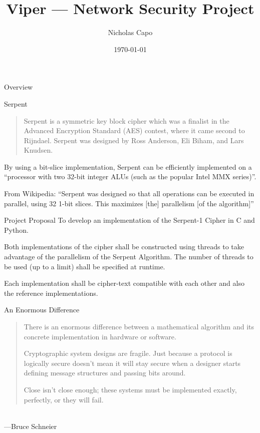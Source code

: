 \documentclass[style=sailor, mode=present]{powerdot}
\title{Viper --- Network Security Project}
\author{Nicholas Capo}
\date{\today}
\begin{document}
\maketitle

\begin{slide}[toc=]{Overview}
\tableofcontents[type=1]
\end{slide}

\begin{slide}{Serpent}
\blockquote{Serpent is a symmetric key block cipher which was a finalist in the Advanced Encryption Standard (AES) contest, where it came second to Rijndael. Serpent was designed by Ross Anderson, Eli Biham, and Lars Knudsen.}\cite{wikipedia}\pause
\medskip

By using a bit-slice implementation, Serpent can be efficiently implemented on a \enquote{processor with two 32-bit integer ALUs (such as the popular Intel MMX series)}.\cite[2]{submission}\pause
\medskip

From Wikipedia: \enquote{Serpent was designed so that all operations can be executed in parallel, using 32 1-bit slices. This maximizes [the] parallelism [of the algorithm]}\cite{wikipedia}
\end{slide}

\begin{slide}{Project Proposal}
To develop an implementation of the Serpent-1 Cipher \cite{wikipedia}\cite{homepage} in C and Python.\pause
\medskip

Both implementations of the cipher shall be constructed using threads to take advantage of the parallelism of the Serpent Algorithm. The number of threads to be used (up to a limit) shall be specified at runtime. \pause
\medskip

Each implementation shall be cipher-text compatible with each other and also the reference implementations.  \cite{referenceImplementation}
\end{slide}

\begin{slide}[toc=]{An Enormous Difference}
\pause
\blockquote{There is an enormous difference between a mathematical algorithm and its concrete implementation in hardware or software.\pause
\medskip

Cryptographic system designs are fragile. Just because a protocol is logically secure doesn't mean it will stay secure when a designer starts defining message structures and passing bits around.\pause
\medskip

Close isn't close enough; these systems must be implemented exactly, perfectly, or they will fail.} \\---Bruce Schneier \cite{Schneier:Harder}
\end{slide}
\end{document}
